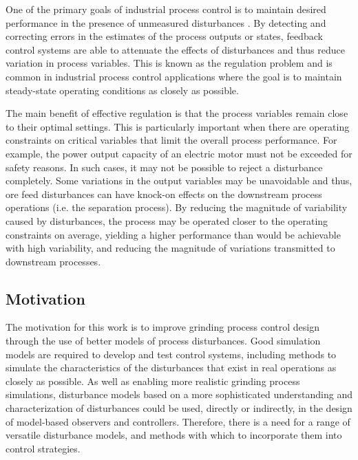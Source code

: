 One of the primary goals of industrial process control is to maintain desired performance in the presence of unmeasured disturbances \citep{astrom_computer_1997}. By detecting and correcting errors in the estimates of the process outputs or states, feedback control systems are able to attenuate the effects of disturbances and thus reduce variation in process variables. This is known as the regulation problem and is common in industrial process control applications where the goal is to maintain steady-state operating conditions as closely as possible.

The main benefit of effective regulation is that the process variables remain close to their optimal settings. This is particularly important when there are operating constraints on critical variables that limit the overall process performance. For example, the power output capacity of an electric motor must not be exceeded for safety reasons. In such cases, it may not be possible to reject a disturbance completely. Some variations in the output variables may be unavoidable and thus, ore feed disturbances can have knock-on effects on the downstream process operations (i.e. the separation process). By reducing the magnitude of variability caused by disturbances, the process may be operated closer to the operating constraints on average, yielding a higher performance than would be achievable with high variability, and reducing the magnitude of variations transmitted to downstream processes.

\subsection*{Motivation}

The motivation for this work is to improve grinding process control design through the use of better models of process disturbances. Good simulation models are required to develop and test control systems, including methods to simulate the characteristics of the disturbances that exist in real operations as closely as possible. As well as enabling more realistic grinding process simulations, disturbance models based on a more sophisticated understanding and characterization of disturbances could be used, directly or indirectly, in the design of model-based observers and controllers. Therefore, there is a need for a range of versatile disturbance models, and methods with which to incorporate them into control strategies.


